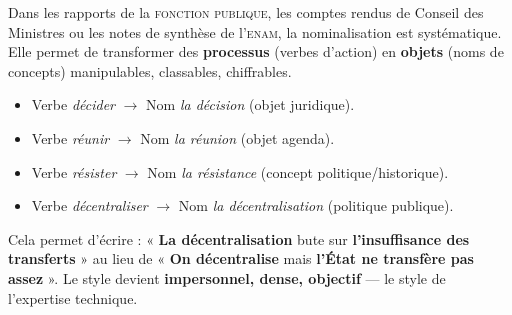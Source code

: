 \documentclass[11pt]{article}
\begin{document}
\begin{savaistu}
Dans les rapports de la \textsc{fonction publique}, les comptes rendus de Conseil des Ministres ou les notes de synthèse de l'\textsc{enam}, la nominalisation est systématique. Elle permet de transformer des \textbf{processus} (verbes d'action) en \textbf{objets} (noms de concepts) manipulables, classables, chiffrables.
\begin{itemize}
\item Verbe \emph{décider} $\rightarrow$ Nom \emph{la décision} (objet juridique).
\item Verbe \emph{réunir} $\rightarrow$ Nom \emph{la réunion} (objet agenda).
\item Verbe \emph{résister} $\rightarrow$ Nom \emph{la résistance} (concept politique/historique).
\item Verbe \emph{décentraliser} $\rightarrow$ Nom \emph{la décentralisation} (politique publique).
\end{itemize}
Cela permet d'écrire : « \textbf{La décentralisation} bute sur \textbf{l'insuffisance des transferts} » au lieu de « \textbf{On décentralise} mais \textbf{l'État ne transfère pas assez} ». Le style devient \textbf{impersonnel, dense, objectif} — le style de l'expertise technique.
\end{savaistu}
\end{document}
